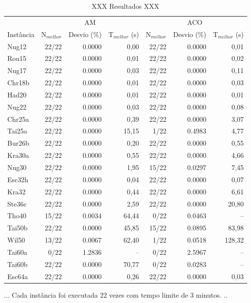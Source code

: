 \begin{table}[H]
  \caption{XXX Resultados XXX}
  \centering
  \begin{tabular}{l r r r r r r}
    \toprule
    & \multicolumn{3}{c}{AM} & \multicolumn{3}{c}{ACO} \\
    \cmidrule(r){2-4} \cmidrule(r){5-7}
    Instância & N$_{melhor}$ & Desvio (\%) & T$_{melhor}$ (s) & N$_{melhor}$
    & Desvio (\%) & T$_{melhor}$ (s)\\
    \midrule
Nug12 & 22/22 & 0.0000 & 0,00 & 22/22 & 0.0000 & 0,01 \\
Rou15 & 22/22 & 0.0000 & 0,01 & 22/22 & 0.0000 & 0,02 \\
Nug17 & 22/22 & 0.0000 & 0,03 & 22/22 & 0.0000 & 0,11 \\
Chr18b & 22/22 & 0.0000 & 0,01 & 22/22 & 0.0000 & 0,03 \\
Had20 & 22/22 & 0.0000 & 0,01 & 22/22 & 0.0000 & 0,01 \\
Nug22 & 22/22 & 0.0000 & 0,03 & 22/22 & 0.0000 & 0,08 \\
Chr25a & 22/22 & 0.0000 & 0,39 & 22/22 & 0.0000 & 3,07 \\
Tai25a & 22/22 & 0.0000 & 15,15 & 1/22 & 0.4983 & 4,77 \\
Bur26b & 22/22 & 0.0000 & 0,20 & 22/22 & 0.0000 & 0,55 \\
Kra30a & 22/22 & 0.0000 & 0,55 & 22/22 & 0.0000 & 4,66 \\
Nug30 & 22/22 & 0.0000 & 1,95 & 15/22 & 0.0297 & 7,45 \\
Esc32h & 22/22 & 0.0000 & 0,04 & 22/22 & 0.0000 & 0,07 \\
Kra32 & 22/22 & 0.0000 & 0,44 & 22/22 & 0.0000 & 6,61 \\
Ste36c & 22/22 & 0.0000 & 2,59 & 22/22 & 0.0000 & 20,80 \\
Tho40 & 15/22 & 0.0034 & 64,44 & 0/22 & 0.0463 & -- \\
Tai50b & 22/22 & 0.0000 & 45,85 & 15/22 & 0.0895 & 83,98 \\
Wil50 & 13/22 & 0.0067 & 62,40 & 1/22 & 0.0518 & 128,32 \\
Tai60a & 0/22 & 1.2836 & -- & 0/22 & 2.5967 & -- \\
Tai60b & 22/22 & 0.0000 & 70,77 & 0/22 & 0.0283 & -- \\
Esc64a & 22/22 & 0.0000 & 0,26 & 22/22 & 0.0000 & 0,03 \\
    \bottomrule
  \end{tabular}
\end{table}

...
Cada instância foi executada 22 vezes com tempo limite de 3 minutos.
..
